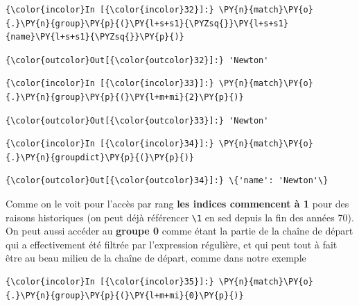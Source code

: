     \begin{Verbatim}[commandchars=\\\{\}]
{\color{incolor}In [{\color{incolor}32}]:} \PY{n}{match}\PY{o}{.}\PY{n}{group}\PY{p}{(}\PY{l+s+s1}{\PYZsq{}}\PY{l+s+s1}{name}\PY{l+s+s1}{\PYZsq{}}\PY{p}{)}
\end{Verbatim}


\begin{Verbatim}[commandchars=\\\{\}]
{\color{outcolor}Out[{\color{outcolor}32}]:} 'Newton'
\end{Verbatim}
            
    \begin{Verbatim}[commandchars=\\\{\}]
{\color{incolor}In [{\color{incolor}33}]:} \PY{n}{match}\PY{o}{.}\PY{n}{group}\PY{p}{(}\PY{l+m+mi}{2}\PY{p}{)}
\end{Verbatim}


\begin{Verbatim}[commandchars=\\\{\}]
{\color{outcolor}Out[{\color{outcolor}33}]:} 'Newton'
\end{Verbatim}
            
    \begin{Verbatim}[commandchars=\\\{\}]
{\color{incolor}In [{\color{incolor}34}]:} \PY{n}{match}\PY{o}{.}\PY{n}{groupdict}\PY{p}{(}\PY{p}{)}
\end{Verbatim}


\begin{Verbatim}[commandchars=\\\{\}]
{\color{outcolor}Out[{\color{outcolor}34}]:} \{'name': 'Newton'\}
\end{Verbatim}
            
    Comme on le voit pour l'accès par rang \textbf{les indices commencent à
1} pour des raisons historiques (on peut déjà référencer
\texttt{\textbackslash{}1} en sed depuis la fin des années 70).\\

On peut aussi accéder au \textbf{groupe 0} comme étant la partie de la
chaîne de départ qui a effectivement été filtrée par l'expression
régulière, et qui peut tout à fait être au beau milieu de la chaîne de
départ, comme dans notre exemple

    \begin{Verbatim}[commandchars=\\\{\}]
{\color{incolor}In [{\color{incolor}35}]:} \PY{n}{match}\PY{o}{.}\PY{n}{group}\PY{p}{(}\PY{l+m+mi}{0}\PY{p}{)}
\end{Verbatim}


